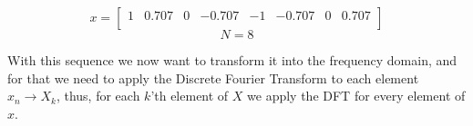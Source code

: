 \documentclass[
  oneside,
  11pt, a4paper,
  footinclude=true,
  headinclude=true,
  cleardoublepage=empty
]{scrbook}
\begin{document}
\pagestyle{empty}

\begin{equation*}
    x = 
    \begin{bmatrix}
        1 & 0.707 & 0 & -0.707 & -1 & -0.707 & 0 & 0.707\\
    \end{bmatrix}
\end{equation*}
\begin{equation*}
    N = 8
\end{equation*}

With this sequence we now want to transform it into the frequency domain, and for that we need to apply the Discrete Fourier Transform to each element \( x_{n} \rightarrow X_{k} \), thus, for each \(k\)'th element of \(X\) we apply the DFT for every element of \(x\).
\end{document}
